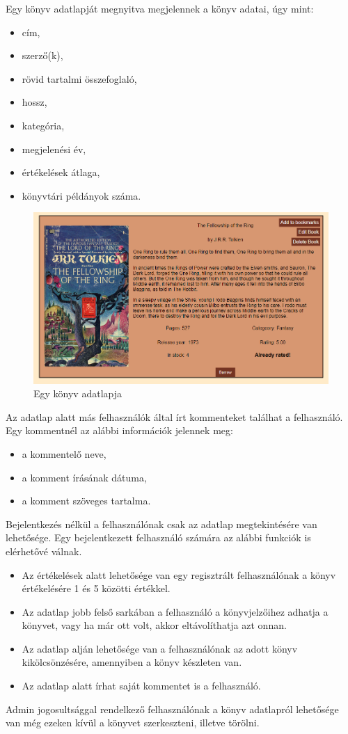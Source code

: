 Egy könyv adatlapját megnyitva megjelennek a könyv adatai, úgy mint: 
\begin{itemize}
    \item cím,
    \item szerző(k),
    \item rövid tartalmi összefoglaló,
    \item hossz,
    \item kategória,
    \item megjelenési év,
    \item értékelések átlaga,
    \item könyvtári példányok száma.
\end{itemize}

\begin{figure}[h]
    \centering
    \includegraphics[scale=0.55]{images/application/bookcard.png}
    \caption{Egy könyv adatlapja}
    \label{fig:bookcard}
\end{figure}

Az adatlap alatt más felhasználók által írt kommenteket találhat a felhasználó. Egy kommentnél az alábbi információk jelennek meg:
\begin{itemize}
    \item a kommentelő neve,
    \item a komment írásának dátuma,
    \item a komment szöveges tartalma.
\end{itemize}
Bejelentkezés nélkül a felhasználónak csak az adatlap megtekintésére van lehetősége. Egy bejelentkezett felhasználó számára az alábbi funkciók is elérhetővé válnak.
\begin{itemize}
    \item Az értékelések alatt lehetősége van egy regisztrált felhasználónak a könyv értékelésére 1 és 5 közötti értékkel.
    \item  Az adatlap jobb felső sarkában a felhasználó a könyvjelzőihez adhatja a könyvet, vagy ha már ott volt, akkor eltávolíthatja azt onnan.
    \item  Az adatlap alján lehetősége van a felhasználónak az adott könyv kikölcsönzésére, amennyiben a könyv készleten van.
    \item  Az adatlap alatt írhat saját kommentet is a felhasználó.
\end{itemize}
Admin jogosultsággal rendelkező felhasználónak a könyv adatlapról lehetősége van még ezeken kívül a könyvet szerkeszteni, illetve törölni.

